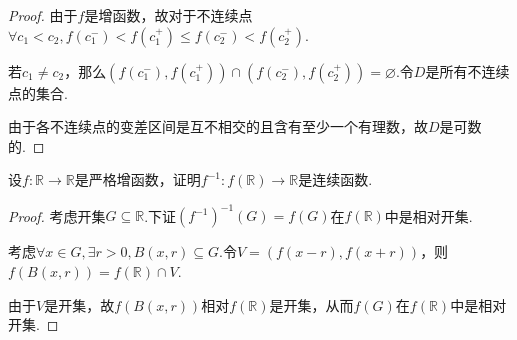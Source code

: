 \begin{proof}
    由于\(f\)是增函数，故对于不连续点\(\forall c_1<c_2, f(c_1^-)<f(c_1^+) \leq f(c_2^-)<f(c_2^+)\).

    若\(c_1 \ne c_2\)，那么\((f(c_1^-), f(c_1^+)) \cap (f(c_2^-), f(c_2^+))=\varnothing\).令\(D\)是所有不连续点的集合.

    {\kaishu 由于各不连续点的变差区间是互不相交的且含有至少一个有理数，故\(D\)是可数的.}
\end{proof}

\begin{problem}[2.B.23]\label{1.C.4}
    设\(f: \mathbb{R} \to \mathbb{R}\)是严格增函数，证明\(f^{-1}: f(\mathbb{R}) \to \mathbb{R}\)是连续函数.
\end{problem}

\begin{proof}
    考虑开集\(G \subseteq \mathbb{R}\).下证\((f^{-1})^{-1}(G)=f(G)\)在\(f(\mathbb{R})\)中是相对开集.

    考虑\(\forall x \in G, \exists r>0, B(x,r) \subseteq G\).令\(V=(f(x-r),f(x+r))\)，则\(f(B(x,r))=f(\mathbb{R}) \cap V\).

    由于\(V\)是开集，故\(f(B(x,r))\)相对\(f(\mathbb{R})\)是开集，从而\(f(G)\)在\(f(\mathbb{R})\)中是相对开集.
\end{proof}

